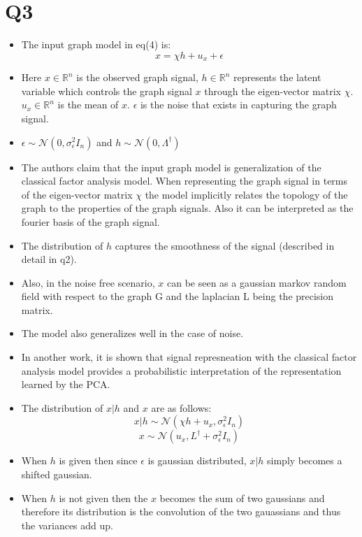 \documentclass{article}
\begin{document}
\section*{Q3}
\begin{itemize}
\item The input graph model in eq(4) is:
  $$ x = \chi h + u_x + \epsilon$$
\item Here $x \in \mathbb{R}^n$ is the observed graph signal, $h \in \mathbb{R}^n$ represents the latent variable which controls the graph signal $x$ through the eigen-vector matrix $\chi$. $u_x \in \mathbb{R}^n$ is the mean of $x$. $\epsilon$ is the noise that exists in capturing the graph signal.
\item $\epsilon \sim \mathcal{N}(0, \sigma_{\epsilon}^2I_{n})$ and $h \sim \mathcal{N}(0, \Lambda^{\dagger})$
\item The authors claim that the input graph model is generalization of the classical factor analysis model. When representing the graph signal in terms of the eigen-vector matrix $\chi$ the model implicitly relates the topology of the graph to the properties of the graph signals. Also it can be interpreted as the fourier basis of the graph signal.
\item The distribution of $h$ captures the smoothness of the signal (described in detail in q2).
\item Also, in the noise free scenario, $x$ can be seen as a gaussian markov random field with respect to the graph G and the laplacian L being the precision matrix.
\item The model also generalizes well in the case of noise.
\item In another work, it is shown that signal represneation with the classical factor analysis model provides a probabilistic interpretation of the representation learned by the PCA.
\item The distribution of $x|h$ and $x$ are as follows:
  $$x|h \sim \mathcal{N}(\chi h + u_x, \sigma_{\epsilon}^2 I_n)$$
  $$x \sim \mathcal{N}(u_x, L^{\dagger} + \sigma_{\epsilon}^2 I_n)$$
\item When $h$ is given then since $\epsilon$ is gaussian distributed, $x|h$ simply becomes a shifted gaussian.
\item When $h$ is not given then the $x$ becomes the sum of two gaussians and therefore its distribution is the convolution of the two gauassians and thus the variances add up.
\end{itemize}
\end{document}
